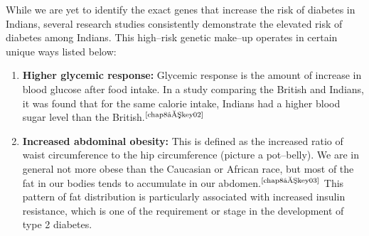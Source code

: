 While we are yet to identify the exact genes that increase the risk of diabetes in Indians, several research studies consistently demonstrate the elevated risk of diabetes among Indians. This high–risk genetic make–up operates in certain unique ways listed below:

 \begin{enumerate}
 \itemsep=0pt
\item \textbf{Higher glycemic response:} Glycemic response is the amount of increase in blood glucose after food intake. In a study comparing the British and Indians, it was found that for the same calorie intake, Indians had a higher blood sugar level than the British.$^{\text{\cite{chap8–key02}}}$
\item \textbf{Increased abdominal obesity:} This is defined as the increased ratio of waist circumference to the hip circumference (picture a pot–belly). We are in general not more obese than the Cauca\-sian or African race, but most of the fat in our bodies tends to accumulate in our abdomen.$^{\text{\cite{chap8–key03}}}$ This pattern of fat distribution is particularly associated with increased insulin resistance, which is one of the requirement or stage in the development of type 2 diabetes.


\end{enumerate}
